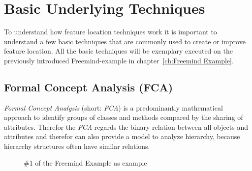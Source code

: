 \chapter{Basic Underlying Techniques}

To understand how feature location techniques work it is important to understand a few basic techniques that are commonly used to create or improve feature location. All the basic techniques  will be exemplary executed on the previously introduced Freemind-example in chapter~\ref{ch:Freemind Example}.

\section{Formal Concept Analysis (FCA)}
\label{sec:FCA}
\emph{Formal Concept Analysis} (short: \emph{FCA}) is a predominantly mathematical approach to identify groups of classes and methods compared by the sharing of attributes. Therefor the \emph{FCA} regards the binary relation between all objects and attributes and therefor can also provide a model to analyze hierarchy, because hierarchy structures often have similar relations. 
\begin{figure}
  \caption{\#1 of the Freemind Example as example}
  \label{flowchart}
\end{figure}


